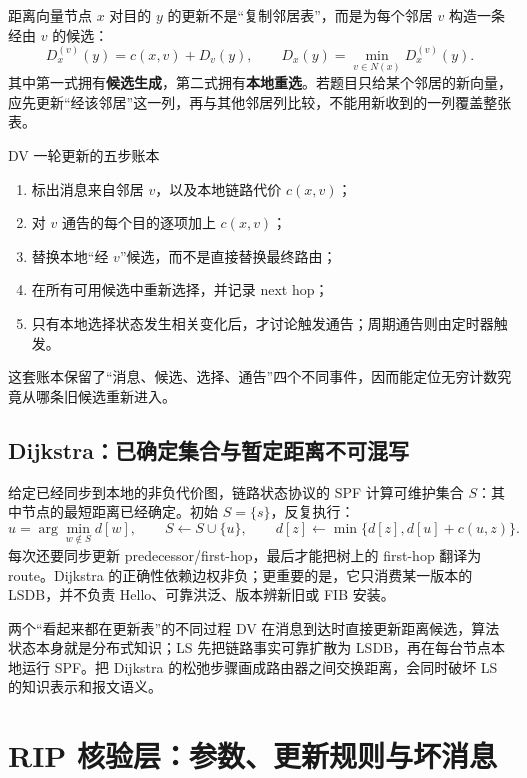 \documentclass[11pt,a4paper]{ctexart}
\newcommand{\kw}[1]{\textbf{\color{deep}#1}}
\begin{document}
距离向量节点 $x$ 对目的 $y$ 的更新不是“复制邻居表”，而是为每个邻居 $v$ 构造一条经由 $v$ 的候选：
\[
  D_x^{(v)}(y)=c(x,v)+D_v(y),
  \qquad
  D_x(y)=\min_{v\in N(x)}D_x^{(v)}(y).
\]
其中第一式拥有\kw{候选生成}，第二式拥有\kw{本地重选}。若题目只给某个邻居的新向量，应先更新“经该邻居”这一列，再与其他邻居列比较，不能用新收到的一列覆盖整张表。

\begin{methodbox}{DV 一轮更新的五步账本}
\begin{enumerate}
  \item 标出消息来自邻居 $v$，以及本地链路代价 $c(x,v)$；
  \item 对 $v$ 通告的每个目的逐项加上 $c(x,v)$；
  \item 替换本地“经 $v$”候选，而不是直接替换最终路由；
  \item 在所有可用候选中重新选择，并记录 next hop；
  \item 只有本地选择状态发生相关变化后，才讨论触发通告；周期通告则由定时器触发。
\end{enumerate}
这套账本保留了“消息、候选、选择、通告”四个不同事件，因而能定位无穷计数究竟从哪条旧候选重新进入。
\end{methodbox}

\subsection{Dijkstra：已确定集合与暂定距离不可混写}

给定已经同步到本地的非负代价图，链路状态协议的 SPF 计算可维护集合 $S$：其中节点的最短距离已经确定。初始 $S=\{s\}$，反复执行：
\[
  u=\arg\min_{w\notin S} d[w],\qquad
  S\leftarrow S\cup\{u\},\qquad
  d[z]\leftarrow\min\{d[z],d[u]+c(u,z)\}.
\]
每次还要同步更新 predecessor/first-hop，最后才能把树上的 first-hop 翻译为 route。Dijkstra 的正确性依赖边权非负；更重要的是，它只消费某一版本的 LSDB，并不负责 Hello、可靠洪泛、版本辨新旧或 FIB 安装。

\begin{warnbox}{两个“看起来都在更新表”的不同过程}
DV 在消息到达时直接更新距离候选，算法状态本身就是分布式知识；LS 先把链路事实可靠扩散为 LSDB，再在每台节点本地运行 SPF。把 Dijkstra 的松弛步骤画成路由器之间交换距离，会同时破坏 LS 的知识表示和报文语义。
\end{warnbox}

\section{RIP 核验层：参数、更新规则与坏消息}
\end{document}
